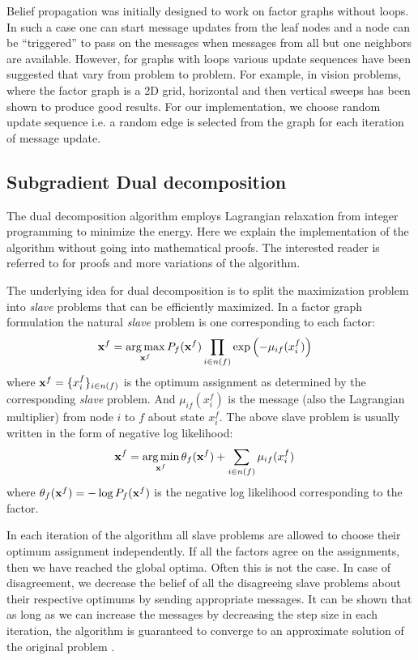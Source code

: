 \documentclass[letterpaper, 10 pt, conference]{ieeeconf} %
\DeclareMathOperator*{\argmin}{arg\,min}
\DeclareMathOperator*{\argmax}{arg\,max}
\begin{document}
Belief propagation was initially designed to work on factor graphs without
loops. In such a case one can start message updates from the leaf nodes and
a node can be ``triggered'' to pass on the messages when messages from all 
but one neighbors are available. However, for graphs with loops various update
sequences have been suggested that vary from problem to problem. For example,
in vision problems, where the factor graph is a 2D grid, horizontal and then
vertical sweeps has been shown to produce good results.
For our implementation, we choose random update sequence i.e. a random edge is
selected from the graph for each iteration of message update.

\subsection{Subgradient Dual decomposition}
\newcommand{\msg}[3]{\mu_{#1#2}(#3)}
\newcommand{\assign}{\leftarrow}
\newcommand{\Sx}{L_i}

The dual decomposition algorithm employs Lagrangian relaxation from
integer programming to minimize the energy. Here we explain the implementation of the
algorithm without going into mathematical proofs. The interested reader is
referred to
\cite{sontag2011introduction,jojic2010accelerated,komodakis2009beyond} for
proofs and more variations of the algorithm. 

The underlying idea for dual decomposition is to split the maximization
problem into \emph{slave} problems that can be efficiently maximized. In a
factor graph formulation the natural \emph{slave} problem is one corresponding
to each factor:
\begin{align}
  \map^f &= \argmax\limits_{\map^f} P_f(\map^f)
  \prod\limits_{i \in n(f)}\exp\left(-\msg{i}{f}{x^f_i} \right)
\end{align}
where $\mathbf{x}^f = \{x_i^f\}_{i \in n(f)}$ is the optimum assignment 
as determined by the corresponding \emph{slave}
problem. And $\msg{i}{f}{x^f_i}$ is the message (also the Lagrangian
multiplier) from node $i$ to $f$ about state $x^f_i$. 
The above slave problem is usually written in the form of 
negative log likelihood:
\begin{align}
  \map^f &= \argmin\limits_{\map^f} \theta_f(\map^f)
  +\sum\limits_{i \in n(f)}\msg{i}{f}{x^f_i}
  \label{eq:slavemin}
\end{align}
where $\theta_f(\mathbf{x}^f) = -\log P_f(\mathbf{x}^f)$ is the negative log
likelihood corresponding to the factor.

In each iteration of the algorithm all slave problems are allowed to choose
their optimum assignment independently. If all the factors agree on the
assignments, then we have reached the global optima. Often this is
not the case. In case of disagreement, we decrease the belief of all the
disagreeing slave problems about their respective optimums by sending
appropriate messages. It can be shown that as long as we can increase the
messages by decreasing the step size in each iteration, the algorithm is guaranteed
to converge to an approximate solution of the original problem
\cite{sontag2011introduction}.
\end{document}
